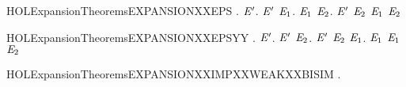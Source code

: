 \newcommand{\HOLExpansionTheoremsEXPANSIONXXALT}{\UseVerbatim{HOLExpansionTheoremsEXPANSIONXXALT}}
\begin{SaveVerbatim}{HOLExpansionTheoremsEXPANSIONXXEPS}
\HOLTokenTurnstile{} \HOLSymConst{\HOLTokenForall{}}.
         \HOLSymConst{\HOLTokenImp{}}
       \HOLSymConst{\HOLTokenForall{}} \ensuremath{\HOLBoundVar{E}\sp{\prime}}.
             \ensuremath{\HOLBoundVar{E}\sp{\prime}} \HOLSymConst{\HOLTokenImp{}} \HOLSymConst{\HOLTokenForall{}}\ensuremath{\HOLBoundVar{E}\sb{\mathrm{1}}}.   \ensuremath{\HOLBoundVar{E}\sb{\mathrm{1}}} \HOLSymConst{\HOLTokenImp{}} \HOLSymConst{\HOLTokenExists{}}\ensuremath{\HOLBoundVar{E}\sb{\mathrm{2}}}.  \ensuremath{\HOLBoundVar{E}\sp{\prime}} \ensuremath{\HOLBoundVar{E}\sb{\mathrm{2}}} \HOLSymConst{\HOLTokenConj{}}  \ensuremath{\HOLBoundVar{E}\sb{\mathrm{1}}} \ensuremath{\HOLBoundVar{E}\sb{\mathrm{2}}}
\end{SaveVerbatim}
\newcommand{\HOLExpansionTheoremsEXPANSIONXXEPS}{\UseVerbatim{HOLExpansionTheoremsEXPANSIONXXEPS}}
\begin{SaveVerbatim}{HOLExpansionTheoremsEXPANSIONXXEPSYY}
\HOLTokenTurnstile{} \HOLSymConst{\HOLTokenForall{}}.
         \HOLSymConst{\HOLTokenImp{}}
       \HOLSymConst{\HOLTokenForall{}} \ensuremath{\HOLBoundVar{E}\sp{\prime}}.
             \ensuremath{\HOLBoundVar{E}\sp{\prime}} \HOLSymConst{\HOLTokenImp{}} \HOLSymConst{\HOLTokenForall{}}\ensuremath{\HOLBoundVar{E}\sb{\mathrm{2}}}.  \ensuremath{\HOLBoundVar{E}\sp{\prime}} \ensuremath{\HOLBoundVar{E}\sb{\mathrm{2}}} \HOLSymConst{\HOLTokenImp{}} \HOLSymConst{\HOLTokenExists{}}\ensuremath{\HOLBoundVar{E}\sb{\mathrm{1}}}.   \ensuremath{\HOLBoundVar{E}\sb{\mathrm{1}}} \HOLSymConst{\HOLTokenConj{}}  \ensuremath{\HOLBoundVar{E}\sb{\mathrm{1}}} \ensuremath{\HOLBoundVar{E}\sb{\mathrm{2}}}
\end{SaveVerbatim}
\newcommand{\HOLExpansionTheoremsEXPANSIONXXEPSYY}{\UseVerbatim{HOLExpansionTheoremsEXPANSIONXXEPSYY}}
\begin{SaveVerbatim}{HOLExpansionTheoremsEXPANSIONXXIMPXXWEAKXXBISIM}
\HOLTokenTurnstile{} \HOLSymConst{\HOLTokenForall{}}.   \HOLSymConst{\HOLTokenImp{}}  
\end{SaveVerbatim}
